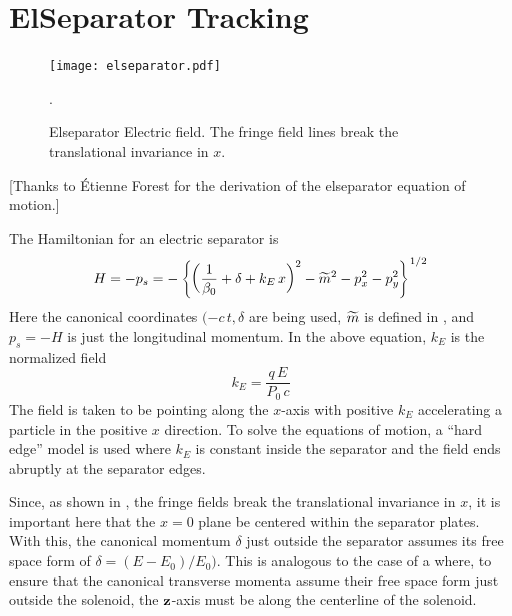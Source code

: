 \section{ElSeparator Tracking}
\label{s:elsep.std}

\begin{figure}[tb]
  \centering
  \texttt{[image: elseparator.pdf]}
  \caption[ElSeparator electric field.]
  {
Elseparator Electric field. The fringe field lines break the
translational invariance in $x$.
  }
  \label{f:elsep}.
\end{figure}

[Thanks to \'Etienne Forest for the derivation of the elseparator equation of motion.]

The Hamiltonian for an electric separator is 
\begin{equation}
  H = -p_s 
  = - \left\{ \left( \frac{1}{\beta_0} + \delta + k_E \, x \right)^2 - 
  \widetilde m^2 - p_x^2 - p_y^2 \right\}^{1/2}
  \label{hp1b}
\end{equation}
Here the canonical coordinates $(-c \, t, \delta$ are being used, $\widetilde m$ is defined in ,
and $p_s = -H$ is just the longitudinal momentum.  In the above equation, $k_E$ is the normalized
field
\begin{equation}
  k_E = \frac{q \, E}{P_0 \, c}
\end{equation}
The field is taken to be pointing along the $x$-axis with positive $k_E$ accelerating a particle in
the positive $x$ direction. To solve the equations of motion, a ``hard edge'' model is used where
$k_E$ is constant inside the separator and the field ends abruptly at the separator edges.

Since, as shown in , the fringe fields break the translational invariance in $x$, it is
important here that the $x = 0$ plane be centered within the separator plates. With this, the
canonical momentum $\delta$ just outside the separator assumes its free space form of $\delta = (E -
E_0) / E_0)$. This is analogous to the case of a  where, to ensure that the canonical
transverse momenta assume their free space form just outside the solenoid, the ${\bf z}$-axis must be
along the centerline of the solenoid.

